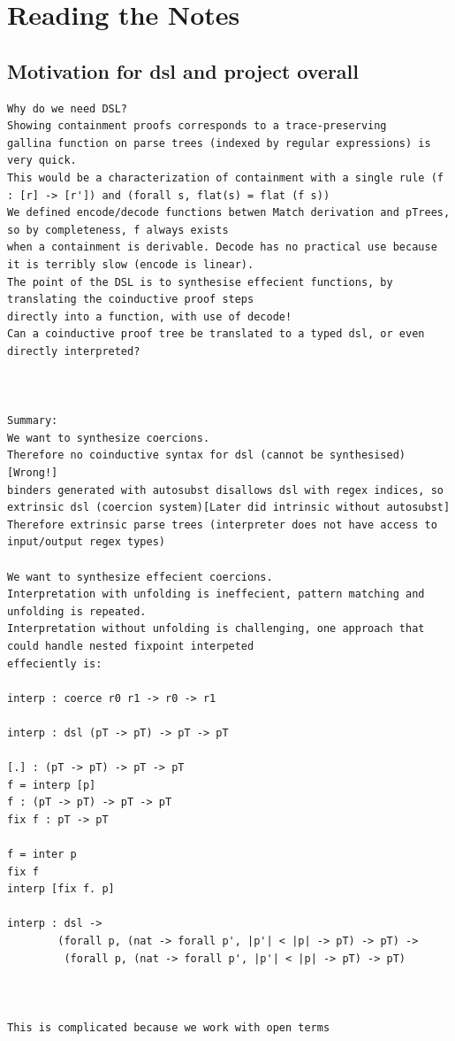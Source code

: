 \section{Reading the Notes}


\subsection{Motivation for dsl and project overall}
\begin{verbatim}
Why do we need DSL?
Showing containment proofs corresponds to a trace-preserving 
gallina function on parse trees (indexed by regular expressions) is very quick.
This would be a characterization of containment with a single rule (f : [r] -> [r']) and (forall s, flat(s) = flat (f s))
We defined encode/decode functions betwen Match derivation and pTrees, so by completeness, f always exists 
when a containment is derivable. Decode has no practical use because it is terribly slow (encode is linear).
The point of the DSL is to synthesise effecient functions, by translating the coinductive proof steps
directly into a function, with use of decode!
Can a coinductive proof tree be translated to a typed dsl, or even directly interpreted?



Summary:
We want to synthesize coercions.
Therefore no coinductive syntax for dsl (cannot be synthesised) [Wrong!]
binders generated with autosubst disallows dsl with regex indices, so extrinsic dsl (coercion system)[Later did intrinsic without autosubst]
Therefore extrinsic parse trees (interpreter does not have access to input/output regex types)

We want to synthesize effecient coercions.
Interpretation with unfolding is ineffecient, pattern matching and unfolding is repeated.
Interpretation without unfolding is challenging, one approach that could handle nested fixpoint interpeted
effeciently is:

interp : coerce r0 r1 -> r0 -> r1

interp : dsl (pT -> pT) -> pT -> pT

[.] : (pT -> pT) -> pT -> pT
f = interp [p]
f : (pT -> pT) -> pT -> pT
fix f : pT -> pT

f = inter p
fix f
interp [fix f. p]

interp : dsl -> 
        (forall p, (nat -> forall p', |p'| < |p| -> pT) -> pT) ->
         (forall p, (nat -> forall p', |p'| < |p| -> pT) -> pT) 



This is complicated because we work with open terms


\end{verbatim}
